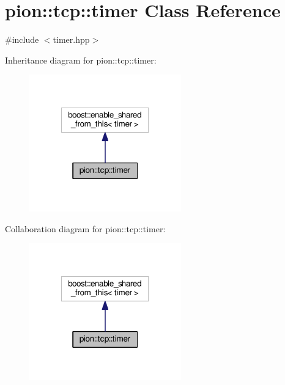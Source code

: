 \hypertarget{classpion_1_1tcp_1_1timer}{\section{pion\-:\-:tcp\-:\-:timer Class Reference}
\label{classpion_1_1tcp_1_1timer}
}


{\ttfamily \#include $<$timer.\-hpp$>$}



Inheritance diagram for pion\-:\-:tcp\-:\-:timer\-:
\nopagebreak
\begin{figure}[H]
\begin{center}
\leavevmode
\includegraphics[width=186pt]{classpion_1_1tcp_1_1timer__inherit__graph}
\end{center}
\end{figure}


Collaboration diagram for pion\-:\-:tcp\-:\-:timer\-:
\nopagebreak
\begin{figure}[H]
\begin{center}
\leavevmode
\includegraphics[width=186pt]{classpion_1_1tcp_1_1timer__coll__graph}
\end{center}
\end{figure}

